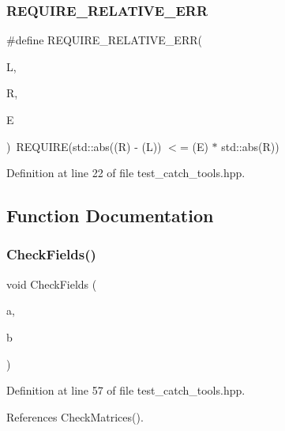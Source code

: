 \subsubsection{R\+E\+Q\+U\+I\+R\+E\+\_\+\+R\+E\+L\+A\+T\+I\+V\+E\+\_\+\+E\+RR}
{\footnotesize\ttfamily \#define R\+E\+Q\+U\+I\+R\+E\+\_\+\+R\+E\+L\+A\+T\+I\+V\+E\+\_\+\+E\+RR(\begin{DoxyParamCaption}\item[{}]{L,  }\item[{}]{R,  }\item[{}]{E }\end{DoxyParamCaption})~R\+E\+Q\+U\+I\+RE(std\+::abs((R) -\/ (L)) $<$= (E) $\ast$ std\+::abs(R))}



Definition at line 22 of file test\+\_\+catch\+\_\+tools.\+hpp.



\subsection{Function Documentation}
\mbox{\label{test__catch__tools_8hpp_aa71d85f71e7317a73a775fd88de2041c}} 
\subsubsection{Check\+Fields()}
{\footnotesize\ttfamily void Check\+Fields (\begin{DoxyParamCaption}\item[{const Field\+Type \&}]{a,  }\item[{const Field\+Type \&}]{b }\end{DoxyParamCaption})\hspace{0.3cm}{\ttfamily [inline]}}



Definition at line 57 of file test\+\_\+catch\+\_\+tools.\+hpp.



References Check\+Matrices().

\mbox{\label{test__catch__tools_8hpp_a069c1790abc5e691ac7bae18caab5c84}} 
